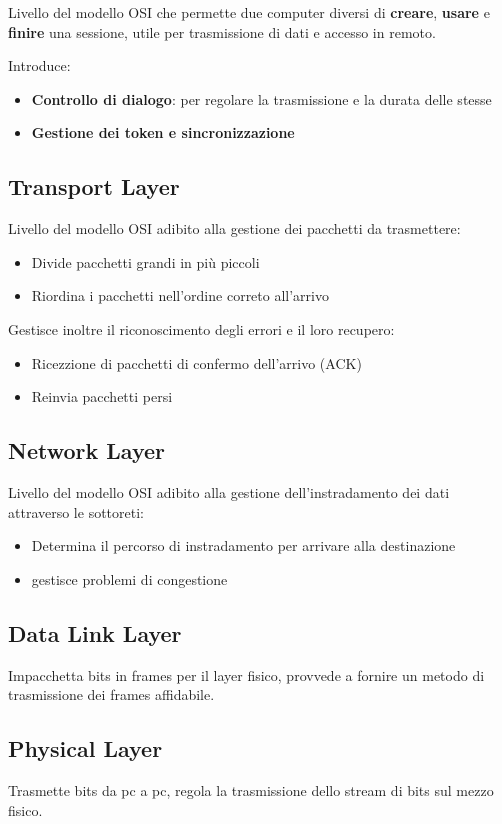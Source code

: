 Livello del modello OSI che permette due computer diversi di \textbf{creare}, \textbf{usare}
e \textbf{finire} una sessione, utile per trasmissione di dati e accesso in remoto.

Introduce:
\begin{itemize}
  \item \textbf{Controllo di dialogo}: per regolare la trasmissione e la durata delle stesse
  \item \textbf{Gestione dei token e sincronizzazione}
\end{itemize}

\subsection{Transport Layer}
Livello del modello OSI adibito alla gestione dei pacchetti da trasmettere:
\begin{itemize}
  \item Divide pacchetti grandi in più piccoli
  \item Riordina i pacchetti nell'ordine correto all'arrivo
\end{itemize}

Gestisce inoltre il riconoscimento degli errori e il loro recupero:
\begin{itemize}
  \item Ricezzione di pacchetti di confermo dell'arrivo (ACK)
  \item Reinvia pacchetti persi
\end{itemize}


\subsection{Network Layer}
Livello del modello OSI adibito alla gestione dell'instradamento dei dati attraverso le sottoreti:
\begin{itemize}
  \item Determina il percorso di instradamento per arrivare alla destinazione
  \item gestisce problemi di congestione
\end{itemize}


\subsection{Data Link Layer}
Impacchetta bits in frames per il layer fisico, provvede a fornire un metodo di trasmissione dei frames affidabile.


\subsection{Physical Layer}
Trasmette bits da pc a pc, regola la trasmissione dello stream di bits sul mezzo fisico.

